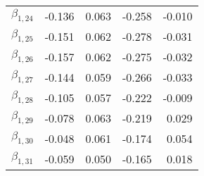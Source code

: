 \begin{tabular}{lrrrr}
$\beta_{1,24}$ & -0.136 &     0.063 &   -0.258 &    -0.010 \\
$\beta_{1,25}$ & -0.151 &     0.062 &   -0.278 &    -0.031 \\
$\beta_{1,26}$ & -0.157 &     0.062 &   -0.275 &    -0.032 \\
$\beta_{1,27}$ & -0.144 &     0.059 &   -0.266 &    -0.033 \\
$\beta_{1,28}$ & -0.105 &     0.057 &   -0.222 &    -0.009 \\
$\beta_{1,29}$ & -0.078 &     0.063 &   -0.219 &     0.029 \\
$\beta_{1,30}$ & -0.048 &     0.061 &   -0.174 &     0.054 \\
$\beta_{1,31}$ & -0.059 &     0.050 &   -0.165 &     0.018 \\
\bottomrule
\end{tabular}
